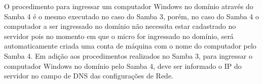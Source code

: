 O procedimento para ingressar um computador Windows no domínio através do Samba 4 é o mesmo executado no caso do Samba 3, porém, no caso do Samba 4 o computador a ser ingressado no domínio não necessita estar cadastrado no servidor pois no momento em que o micro for ingressado no domínio, será automaticamente criada uma conta de máquina com o nome do computador pelo Samba 4.
Em adição aos procedimentos realizados no Samba 3, para ingressar o computador Windows no domínio pelo Samba 4, deve ser informado o IP do servidor no campo de DNS das configurações de Rede.